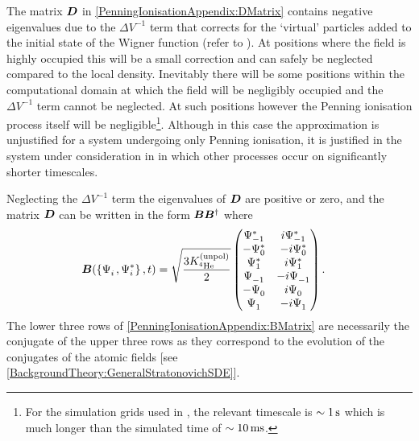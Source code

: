 The matrix $\bm{D}$ in \eqref{PenningIonisationAppendix:DMatrix} contains negative eigenvalues due to the $\Delta V^{-1}$ term that corrects for the `virtual' particles added to the initial state of the Wigner function (refer to ). At positions where the field is highly occupied this will be a small correction and can safely be neglected compared to the local density. Inevitably there will be some positions within the computational domain at which the field will be negligibly occupied and the $\Delta V^{-1}$ term cannot be neglected. At such positions however the Penning ionisation process itself will be negligible\footnote{For the simulation grids used in , the relevant timescale is $\sim \unit[1]{s}$ which is much longer than the simulated time of $\sim \unit[10]{ms}$.}. Although in this case the approximation is unjustified for a system undergoing only Penning ionisation, it is justified in the system under consideration in  in which other processes occur on significantly shorter timescales.

Neglecting the $\Delta V^{-1}$ term the eigenvalues of $\bm{D}$ are positive or zero, and the matrix $\bm{D}$ can be written in the form $\bm{B}\bm{B}^\dagger$ where
\begin{align}
    \vect{B}(\left\{\Psi_i^{\phantom{*}}, \Psi_i^*\right\}, t) &= \sqrt{\frac{3 \Kunpol}{2}}
    \begin{pmatrix}
        \Psi_{-1}^* & i \Psi_{-1}^* \\
        -\Psi_0^* & -i \Psi_0^* \\
        \Psi_1^* & i \Psi_1^* \\
        \Psi_{-1}^{\phantom{*}} & -i \Psi_{-1}^{\phantom{*}} \\
        -\Psi_0^{\phantom{*}} & i \Psi_0^{\phantom{*}} \\
        \Psi_{1}^{\phantom{*}} & -i \Psi_{1}^{\phantom{*}}
    \end{pmatrix}.
    \label{PenningIonisationAppendix:BMatrix}
\end{align}
The lower three rows of \eqref{PenningIonisationAppendix:BMatrix} are necessarily the conjugate of the upper three rows as they correspond to the evolution of the conjugates of the atomic fields [see \eqref{BackgroundTheory:GeneralStratonovichSDE}].

